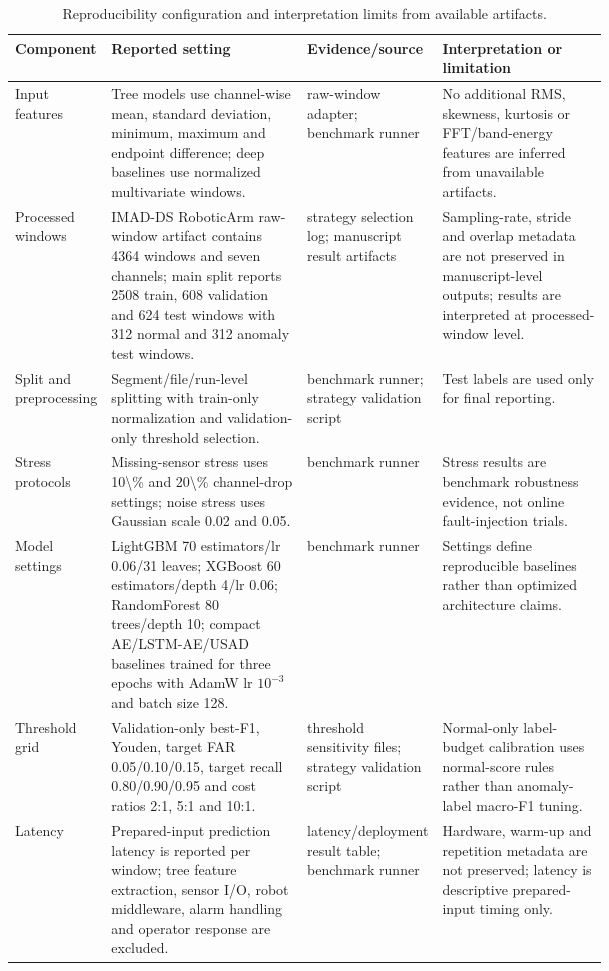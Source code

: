 \begin{table}[!htbp]
\centering
\scriptsize
\setlength{\tabcolsep}{3pt}
\renewcommand{\arraystretch}{1.12}
\caption{Reproducibility configuration and interpretation limits from available artifacts.}
\label{tab:repro-config}
\begin{tabularx}{\linewidth}{@{}>{\RaggedRight\arraybackslash}p{0.15\linewidth}>{\RaggedRight\arraybackslash}p{0.33\linewidth}>{\RaggedRight\arraybackslash}p{0.21\linewidth}>{\RaggedRight\arraybackslash}X@{}}
\toprule
Component & Reported setting & Evidence/source & Interpretation or limitation \\
\midrule
Input features & Tree models use channel-wise mean, standard deviation, minimum, maximum and endpoint difference; deep baselines use normalized multivariate windows. & raw-window adapter; benchmark runner & No additional RMS, skewness, kurtosis or FFT/band-energy features are inferred from unavailable artifacts. \\
Processed windows & IMAD-DS RoboticArm raw-window artifact contains 4364 windows and seven channels; main split reports 2508 train, 608 validation and 624 test windows with 312 normal and 312 anomaly test windows. & strategy selection log; manuscript result artifacts & Sampling-rate, stride and overlap metadata are not preserved in manuscript-level outputs; results are interpreted at processed-window level. \\
Split and preprocessing & Segment/file/run-level splitting with train-only normalization and validation-only threshold selection. & benchmark runner; strategy validation script & Test labels are used only for final reporting. \\
Stress protocols & Missing-sensor stress uses 10\textbackslash{}\% and 20\textbackslash{}\% channel-drop settings; noise stress uses Gaussian scale 0.02 and 0.05. & benchmark runner & Stress results are benchmark robustness evidence, not online fault-injection trials. \\
Model settings & LightGBM 70 estimators/lr 0.06/31 leaves; XGBoost 60 estimators/depth 4/lr 0.06; RandomForest 80 trees/depth 10; compact AE/LSTM-AE/USAD baselines trained for three epochs with AdamW lr $10^{-3}$ and batch size 128. & benchmark runner & Settings define reproducible baselines rather than optimized architecture claims. \\
Threshold grid & Validation-only best-F1, Youden, target FAR 0.05/0.10/0.15, target recall 0.80/0.90/0.95 and cost ratios 2:1, 5:1 and 10:1. & threshold sensitivity files; strategy validation script & Normal-only label-budget calibration uses normal-score rules rather than anomaly-label macro-F1 tuning. \\
Latency & Prepared-input prediction latency is reported per window; tree feature extraction, sensor I/O, robot middleware, alarm handling and operator response are excluded. & latency/deployment result table; benchmark runner & Hardware, warm-up and repetition metadata are not preserved; latency is descriptive prepared-input timing only. \\
\bottomrule
\end{tabularx}
\end{table}
